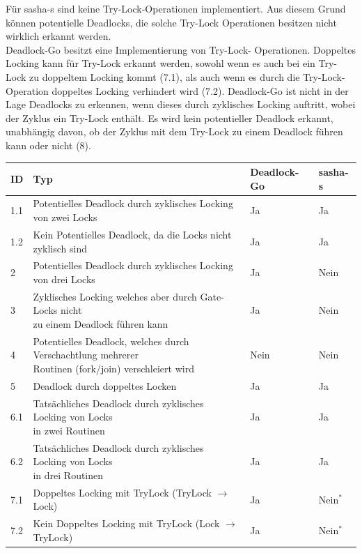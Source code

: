 Für sasha-s sind keine Try-Lock-Operationen implementiert. Aus diesem Grund 
können potentielle Deadlocks, die solche Try-Lock Operationen besitzen nicht 
wirklich erkannt werden.\\Deadlock-Go besitzt eine Implementierung von Try-Lock-
Operationen. Doppeltes Locking kann für Try-Lock erkannt werden, sowohl wenn 
es auch bei ein Try-Lock zu doppeltem Locking kommt (7.1), als auch wenn es
durch die Try-Lock-Operation doppeltes Locking verhindert wird (7.2). Deadlock-Go
ist nicht in der Lage Deadlocks zu erkennen, wenn dieses durch zyklisches Locking 
auftritt, wobei der Zyklus ein Try-Lock enthält. Es wird kein potentieller
Deadlock erkannt, unabhängig davon, ob der Zyklus mit dem Try-Lock zu einem  
Deadlock führen kann oder nicht (8).


\begin{table}[H]
\centering
\begin{tabular}{|l|l|l|l|}
    \hline
    \textbf{ID} & \textbf{Typ} & \textbf{Deadlock-Go} & \textbf{sasha-s} \\ \hline
    1.1 & Potentielles Deadlock durch zyklisches Locking von zwei Locks & Ja & Ja \\ \hline
    1.2 & Kein Potentielles Deadlock, da die Locks nicht zyklisch sind & Ja & Ja \\ \hline
    2 & Potentielles Deadlock durch zyklisches Locking von drei Locks & Ja & Nein \\ \hline
    3 & \makecell[l]{Zyklisches Locking welches aber durch Gate-Locks nicht\\zu einem Deadlock führen kann} & Ja & Nein \\ \hline
    4 & \makecell[l]{Potentielles Deadlock, welches durch Verschachtlung mehrerer\\Routinen (fork/join) verschleiert wird} & Nein & Nein \\ \hline
    5 & Deadlock durch doppeltes Locken & Ja & Ja \\ \hline
    6.1 & \makecell[l]{Tatsächliches Deadlock durch zyklisches Locking von Locks\\in zwei Routinen} & Ja & Ja \\ \hline
    6.2 & \makecell[l]{Tatsächliches Deadlock durch zyklisches Locking von Locks\\in drei Routinen} & Ja & Ja \\ \hline
    7.1 & Doppeltes Locking mit TryLock (TryLock $\to$ Lock) & Ja & Nein$^*$ \\ \hline
    7.2 & Kein Doppeltes Locking mit TryLock (Lock $\to$ TryLock) & Ja & Nein$^*$\\ \hline

\end{tabular}
\end{table}
